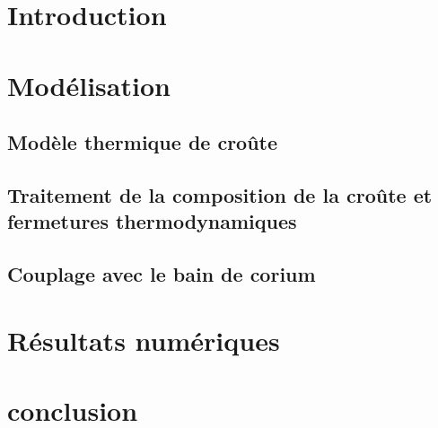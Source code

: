 \documentclass[12pt,a4paper,lmag,nt,article,french]{docDTN}
\begin{document}
\section{Introduction}
\section{Modélisation}
\subsection{Modèle thermique de croûte} \label{sect:thermique}

\subsection{Traitement de la composition de la croûte et fermetures thermodynamiques} \label{sect:thermochimie}

\subsection{Couplage avec le bain de corium}

\section{Résultats numériques}

\section{conclusion}



\end{document}
